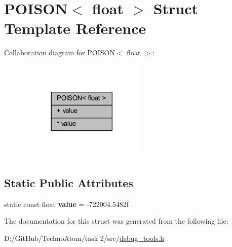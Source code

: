 \hypertarget{struct_p_o_i_s_o_n_3_01float_01_4}{}\section{P\+O\+I\+S\+ON$<$ float $>$ Struct Template Reference}
\label{struct_p_o_i_s_o_n_3_01float_01_4}


Collaboration diagram for P\+O\+I\+S\+ON$<$ float $>$\+:
\nopagebreak
\begin{figure}[H]
\begin{center}
\leavevmode
\includegraphics[width=170pt]{struct_p_o_i_s_o_n_3_01float_01_4__coll__graph}
\end{center}
\end{figure}
\subsection*{Static Public Attributes}
\textbf{ }\par
\begin{DoxyCompactItemize}
\item 
\mbox{\label{struct_p_o_i_s_o_n_3_01float_01_4_af865aaa1259e02b92b1d32bb981ce065}} 
static const float {\bfseries value} = -\/722004.\+5482f
\end{DoxyCompactItemize}



The documentation for this struct was generated from the following file\+:\begin{DoxyCompactItemize}
\item 
D\+:/\+Git\+Hub/\+Techno\+Atom/task 2/src/\hyperlink{debug__tools_8h}{debug\+\_\+tools.\+h}\end{DoxyCompactItemize}
